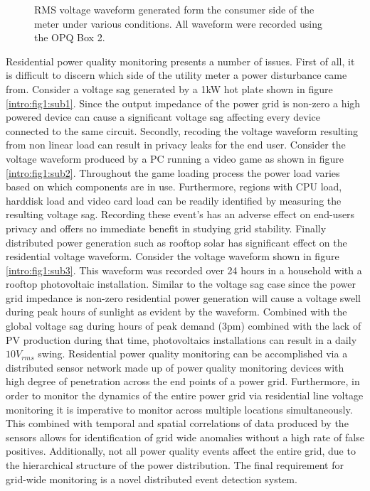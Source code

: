 \begin{figure}[h]
	\caption{RMS voltage waveform generated form the consumer side of the meter under various conditions. All waveform were recorded using the OPQ Box 2.}
	\label{intro:fig:1}
\end{figure}

Residential power quality monitoring presents a number of issues. First of all, it is difficult to discern which side of the utility meter a power disturbance came from. Consider a voltage sag generated by a 1kW hot plate shown in figure \ref{intro:fig1:sub1}.  Since the output impedance of the power grid is non-zero a high powered device can cause a significant voltage sag affecting every device connected to the same circuit. Secondly, recoding the voltage waveform resulting from non linear load can result in privacy leaks for the end user. Consider the voltage waveform produced by a PC running a video game as shown in figure \ref{intro:fig1:sub2}. Throughout the game loading process the power load varies based on which components are in use. Furthermore, regions with CPU load, harddisk load and video card load can be readily identified by measuring the resulting voltage sag. Recording these event's has an adverse effect on end-users privacy and offers no immediate benefit in studying grid stability. Finally distributed power generation such as rooftop solar has significant effect on the residential voltage waveform. Consider the voltage waveform shown in figure \ref{intro:fig1:sub3}. This waveform was recorded over 24 hours in a household with a rooftop photovoltaic installation. Similar to the voltage sag case since the power grid impedance is non-zero residential power generation will cause a voltage swell during peak hours of sunlight as evident by the waveform. Combined with the global voltage sag during hours of peak demand (3pm) combined with the lack of PV production during that time, photovoltaics installations can result in a daily $10V_{rms}$ swing. Residential power quality monitoring can be accomplished via a distributed sensor network made up of power quality monitoring devices with high degree of penetration across the end points of a power grid. Furthermore, in order to monitor the dynamics of the entire power grid via residential line voltage monitoring it is imperative to monitor across multiple locations simultaneously. This combined with temporal and spatial correlations of data produced by the sensors allows for identification of grid wide anomalies without a high rate of false positives. Additionally, not all power quality events affect the entire grid, due to the hierarchical structure of the power distribution. The final requirement for grid-wide monitoring is a novel distributed event detection system.

